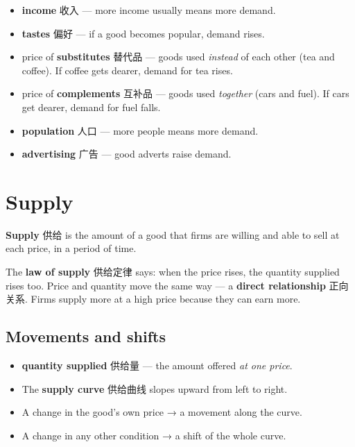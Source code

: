 \documentclass[11pt]{article}
\begin{document}
\begin{itemize}
\item \textbf{income} 收入 — more income usually means more demand.

\item \textbf{tastes} 偏好 — if a good becomes popular, demand rises.

\item price of \textbf{substitutes} 替代品 — goods used \emph{instead} of each other (tea and coffee). If coffee gets dearer, demand for tea rises.

\item price of \textbf{complements} 互补品 — goods used \emph{together} (cars and fuel). If cars get dearer, demand for fuel falls.

\item \textbf{population} 人口 — more people means more demand.

\item \textbf{advertising} 广告 — good adverts raise demand.

\end{itemize}

\section*{Supply}

\textbf{Supply} 供给 is the amount of a good that firms are willing and able to sell at each price, in a period of time.

The \textbf{law of supply} 供给定律 says: when the price rises, the quantity supplied rises too. Price and quantity move the same way — a \textbf{direct relationship} 正向关系. Firms supply more at a high price because they can earn more.

\subsection*{Movements and shifts}

\begin{itemize}
\item \textbf{quantity supplied} 供给量 — the amount offered \emph{at one price}.

\item The \textbf{supply curve} 供给曲线 slopes upward from left to right.

\item A change in the good's own price → a movement along the curve.

\item A change in any other condition → a shift of the whole curve.

\end{itemize}
\end{document}
